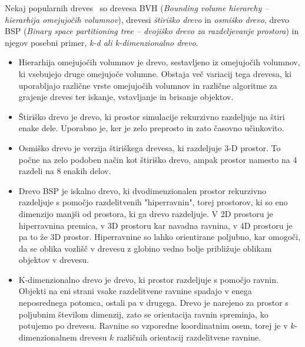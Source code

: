 \documentclass[a4paper,12pt]{article}
\begin{document}
Nekaj popularnih dreves~\cite{weller_brief_2013} so drevesa BVH (\textit{Bounding volume hierarchy -- hierarhija omejujočih volumnov}),
drevesi \textit{štiriško drevo} in \textit{osmiško drevo}, drevo BSP (\textit{Binary space partitioning tree -- dvojiško drevo za razdeljevanje prostora}) in njegov posebni primer, \textit{k-d ali k-di\-men\-zi\-o\-nal\-no drevo}. 

\begin{itemize}
    \item Hierarhija omejujočih volumnov je drevo, sestavljeno iz omejujočih volumnov, ki vsebujejo
    druge omejujoče volumne. Obstaja več variacij tega drevesa, ki uporabljajo različne vrste omejujočih volumnov
    in različne algoritme za grajenje dreves ter iskanje, vstavljanje in brisanje objektov.
    \item Štiriško drevo je drevo, ki prostor simulacije rekurzivno razdeljuje na štiri enake dele. Uporabno je,
    ker je zelo preprosto in zato časovno učinkovito.~\cite{re_analysis_1985}
    \item Osmiško drevo je verzija štiriškega drevesa, ki razdeljuje 3-D prostor. To počne na zelo podoben način kot štiriško drevo, ampak
    prostor namesto na 4 razdeli na 8 enakih delov.~\cite{schnabel_octree-based_2006}
    \item Drevo BSP je iskalno drevo, ki dvodimenzionalen prostor rekurzivno razdeljuje s pomočjo razdelitvenih "hiperravnin",
    torej prostorov, ki so eno dimenzijo manjši od prostora, ki ga drevo razdeljuje. V 2D prostoru je hiperravnina premica,
    v 3D prostoru kar navadna ravnina, v 4D prostoru je pa to že 3D prostor. Hiperravnine so lahko orientirane
    poljubno, kar omogoči, da se oblika vozlišč v drevesu z globino vedno bolje približuje oblikam objektov v drevesu.~\cite{chin_iii5_1995}\cite{mehta_handbook_2018}

    \item K-dimenzionalno drevo je drevo, ki prostor razdeljuje s pomočjo ravnin. Objekti na eni strani vsake razdelitvene
    ravnine spadajo v enega neposrednega potomca, ostali pa v drugega. Drevo je narejeno za prostor s poljubnim številom dimenzij,
    zato se orientacija ravnin spreminja, ko potujemo po drevesu. Ravnine so vzporedne koordinatnim osem, torej je v
    $k$-dimenzionalnem drevesu $k$ različnih orientacij razdelitvene ravnine.~\cite{ramasubramanian_generalized_1989}
    
\end{itemize}
\end{document}
